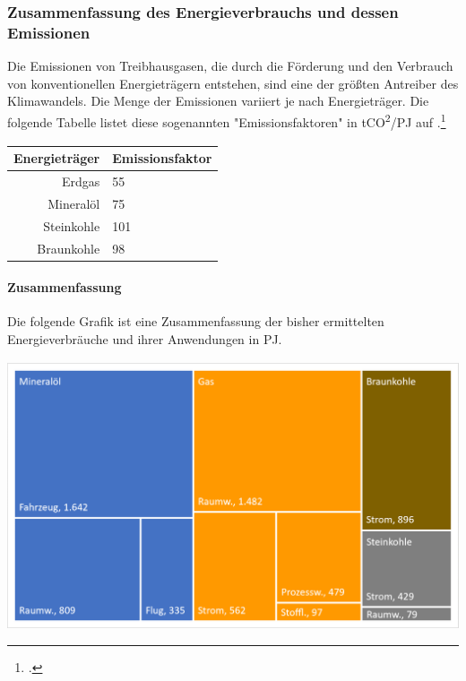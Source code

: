 \documentclass[12pt, ngerman]{article}
\newcommand{\pe}{_{\text{PE}}}
\begin{document}
    \subsubsection{Zusammenfassung des Energieverbrauchs und dessen Emissionen}

    Die Emissionen von Treibhausgasen, die durch die Förderung und den Verbrauch von konventionellen Energieträgern
    entstehen, sind eine der größten Antreiber des Klimawandels.
    Die Menge der Emissionen variiert je nach Energieträger.
    Die folgende Tabelle listet diese sogenannten "Emissionsfaktoren" in \unit{tCO^2/PJ\pe} auf
    .\footcite{balserOlUndGas}

    \begin{center}
        \begin{tabular}{r|l}
            \toprule
            Energieträger & Emissionsfaktor \\
            \midrule
            Erdgas        & 55              \\
            Mineralöl     &  75              \\
            Steinkohle    & 101             \\
            Braunkohle    & 98              \\
            \bottomrule
        \end{tabular}
    \end{center}

    \paragraph{Zusammenfassung}

    Die folgende Grafik ist eine Zusammenfassung der bisher ermittelten Energieverbräuche und ihrer Anwendungen in
    \unit{PJ\pe}.

    \includegraphics{anwendung}
\end{document}
